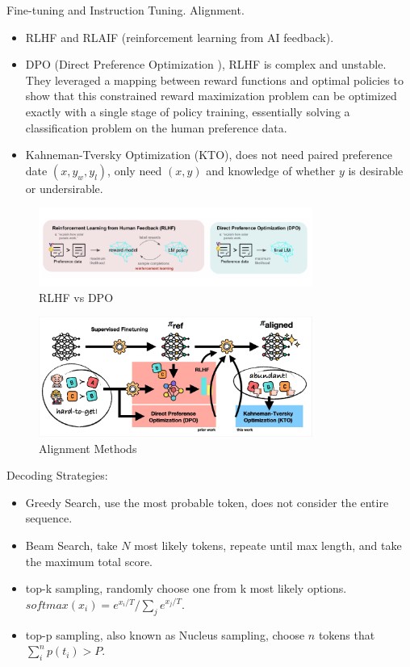 \documentclass[10pt]{elegantbook}
\begin{document}
\vspace{\baselineskip}

Fine-tuning and Instruction Tuning. Alignment.
\begin{itemize}
    \item RLHF and RLAIF (reinforcement learning from AI feedback).
    \item DPO (Direct Preference Optimization ), RLHF is complex and unstable. They leveraged a mapping between reward functions and optimal policies to show 
that this constrained reward maximization problem can be optimized exactly with a single stage of policy training, essentially solving a classification 
problem on the human preference data.
    \item Kahneman-Tversky Optimization (KTO), does not need paired preference date $(x, y_w, y_l)$, only need $(x, y)$ and knowledge of whether $y$ is desirable
or undersirable.
\end{itemize}

\begin{figure}[htbp]
    \centering
    \includegraphics[width=0.80\textwidth]{image/RLHF-vs-DPO.png}
    \caption{RLHF vs DPO}
    \label{fig:RLHF-vs-DPO}
\end{figure}

\begin{figure}[htbp]
    \centering
    \includegraphics[width=0.80\textwidth]{image/alignment_methods.png}
    \caption{Alignment Methods}
    \label{fig:alignment_methods}
\end{figure}

Decoding Strategies:
\begin{itemize}
    \item Greedy Search, use the most probable token, does not consider the entire sequence.
    \item Beam Search, take $N$ most likely tokens, repeate until max length, and take the maximum total score.
    \item top-k sampling, randomly choose one from k most likely options. $softmax(x_i) = e^{x_i / T} / \sum_j e^{x_j / T}$.
    \item top-p sampling, also known as Nucleus sampling, choose $n$ tokens that $\sum_i^n p(t_i) > P$.
\end{itemize}
\end{document}
